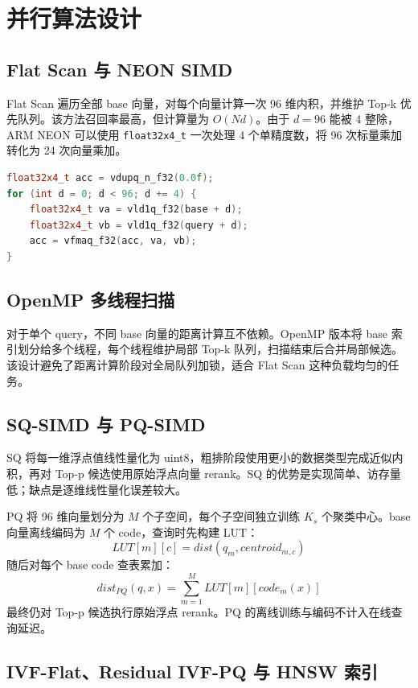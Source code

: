 \documentclass[UTF8,a4paper,10pt]{ctexart}
\begin{document}
\section{并行算法设计}

\subsection{Flat Scan 与 NEON SIMD}

Flat Scan 遍历全部 base 向量，对每个向量计算一次 96 维内积，并维护 Top-k 优先队列。该方法召回率最高，但计算量为 $O(Nd)$。由于 $d=96$ 能被 4 整除，ARM NEON 可以使用 \texttt{float32x4\_t} 一次处理 4 个单精度数，将 96 次标量乘加转化为 24 次向量乘加。

\begin{lstlisting}[language=C++]
float32x4_t acc = vdupq_n_f32(0.0f);
for (int d = 0; d < 96; d += 4) {
    float32x4_t va = vld1q_f32(base + d);
    float32x4_t vb = vld1q_f32(query + d);
    acc = vfmaq_f32(acc, va, vb);
}
\end{lstlisting}

\subsection{OpenMP 多线程扫描}

对于单个 query，不同 base 向量的距离计算互不依赖。OpenMP 版本将 base 索引划分给多个线程，每个线程维护局部 Top-k 队列，扫描结束后合并局部候选。该设计避免了距离计算阶段对全局队列加锁，适合 Flat Scan 这种负载均匀的任务。

\subsection{SQ-SIMD 与 PQ-SIMD}

SQ 将每一维浮点值线性量化为 uint8，粗排阶段使用更小的数据类型完成近似内积，再对 Top-p 候选使用原始浮点向量 rerank。SQ 的优势是实现简单、访存量低；缺点是逐维线性量化误差较大。

PQ 将 96 维向量划分为 $M$ 个子空间，每个子空间独立训练 $K_s$ 个聚类中心。base 向量离线编码为 $M$ 个 code，查询时先构建 LUT：
\[
LUT[m][c] = dist(q_m, centroid_{m,c})
\]
随后对每个 base code 查表累加：
\[
dist_{PQ}(q,x)=\sum_{m=1}^{M} LUT[m][code_m(x)]
\]
最终仍对 Top-p 候选执行原始浮点 rerank。PQ 的离线训练与编码不计入在线查询延迟。

\subsection{IVF-Flat、Residual IVF-PQ 与 HNSW 索引}
\end{document}

